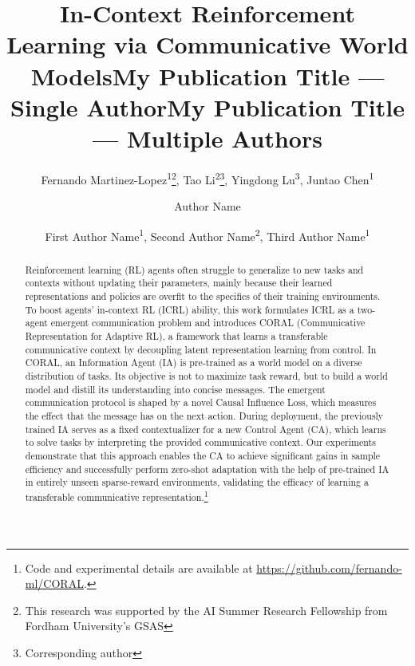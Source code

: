 \documentclass[letterpaper]{article}
\title{In-Context Reinforcement Learning via Communicative World Models}
\author{
    Fernando Martinez-Lopez\textsuperscript{\rm 1}\thanks{This research was supported by the AI Summer Research Fellowship from Fordham University's GSAS}, Tao Li\textsuperscript{\rm 2}\thanks{Corresponding author}, Yingdong Lu\textsuperscript{\rm 3}, Juntao Chen\textsuperscript{\rm 1}
}
\title{My Publication Title --- Single Author}
\author {
    Author Name
}
\title{My Publication Title --- Multiple Authors}
\author {
    First Author Name\textsuperscript{\rm 1},
    Second Author Name\textsuperscript{\rm 2},
    Third Author Name\textsuperscript{\rm 1}
}
\begin{document}
\maketitle
\begin{abstract}
Reinforcement learning (RL) agents often struggle to generalize to new tasks and contexts without updating their parameters, mainly because their learned representations and policies are overfit to the specifics of their training environments. To boost agents' in-context RL (ICRL) ability, this work formulates ICRL as a two-agent emergent communication problem and introduces CORAL (Communicative Representation for Adaptive RL), a framework that learns a transferable communicative context by decoupling latent representation learning from control. In CORAL, an Information Agent (IA) is pre-trained as a world model on a diverse distribution of tasks. Its objective is not to maximize task reward, but to build a world model and distill its understanding into concise messages. The emergent communication protocol is shaped by a novel Causal Influence Loss, which measures the effect that the message has on the next action. During deployment, the previously trained IA serves as a fixed contextualizer for a new Control Agent (CA), which learns to solve tasks by interpreting the provided communicative context. Our experiments demonstrate that this approach enables the CA to achieve significant gains in sample efficiency and successfully perform zero-shot adaptation with the help of pre-trained IA in entirely unseen sparse-reward environments, validating the efficacy of learning a transferable communicative representation.\footnote{Code and experimental details are available at \url{https://github.com/fernando-ml/CORAL}.}
\end{abstract}
\end{document}
